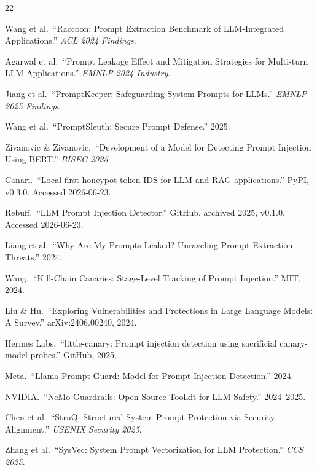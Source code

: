 \documentclass[11pt,a4paper]{ctexart}
\begin{document}
\begin{thebibliography}{22}

Wang et al.\ ``Raccoon: Prompt Extraction Benchmark of LLM-Integrated Applications.''
\textit{ACL 2024 Findings}.

Agarwal et al.\ ``Prompt Leakage Effect and Mitigation Strategies for Multi-turn LLM Applications.''
\textit{EMNLP 2024 Industry}.

Jiang et al.\ ``PromptKeeper: Safeguarding System Prompts for LLMs.''
\textit{EMNLP 2025 Findings}.

Wang et al.\ ``PromptSleuth: Secure Prompt Defense.'' 2025.

Zivanovic \& Zivanovic.\ ``Development of a Model for Detecting Prompt Injection Using BERT.''
\textit{BISEC 2025}.

Canari.\ ``Local-first honeypot token IDS for LLM and RAG applications.'' PyPI, v0.3.0. Accessed 2026-06-23.

Rebuff.\ ``LLM Prompt Injection Detector.'' GitHub, archived 2025, v0.1.0. Accessed 2026-06-23.

Liang et al.\ ``Why Are My Prompts Leaked? Unraveling Prompt Extraction Threats.'' 2024.

Wang.\ ``Kill-Chain Canaries: Stage-Level Tracking of Prompt Injection.'' MIT, 2024.

Liu \& Hu.\ ``Exploring Vulnerabilities and Protections in Large Language Models: A Survey.'' arXiv:2406.00240, 2024.

Hermes Labs.\ ``little-canary: Prompt injection detection using sacrificial canary-model probes.'' GitHub, 2025.

Meta.\ ``Llama Prompt Guard: Model for Prompt Injection Detection.'' 2024.

NVIDIA.\ ``NeMo Guardrails: Open-Source Toolkit for LLM Safety.'' 2024--2025.

Chen et al.\ ``StruQ: Structured System Prompt Protection via Security Alignment.'' \textit{USENIX Security 2025}.

Zhang et al.\ ``SysVec: System Prompt Vectorization for LLM Protection.'' \textit{CCS 2025}.


\end{thebibliography}
\end{document}
